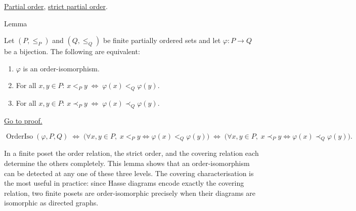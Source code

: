 \begin{dependencies}
\hyperref[def:lattice-order-partial-order]{Partial order},
\hyperref[def:lattice-order-strict-partial-order]{strict partial order}.
\end{dependencies}


\begin{lemmabox}{Lemma}
\begin{lemma}
\label{lem:order-iso-finite-characterizations}
Let $(P, \leq_P)$ and $(Q, \leq_Q)$ be finite partially ordered sets and
let $\varphi : P \to Q$ be a bijection.  The following are equivalent:
\begin{enumerate}
  \item $\varphi$ is an order-isomorphism.
  \item For all $x, y \in P$:\; $x <_P y \;\Longleftrightarrow\; \varphi(x) <_Q \varphi(y)$.
  \item For all $x, y \in P$:\; $x \prec_P y \;\Longleftrightarrow\; \varphi(x) \prec_Q \varphi(y)$.
\end{enumerate}
\hyperref[prf:order-iso-finite-characterizations]{Go to proof.}
\end{lemma}
\end{lemmabox}

\begin{remark*}
\[
\operatorname{OrderIso}(\varphi, P, Q)
\;\Longleftrightarrow\;
\bigl(\forall x,y \in P,\; x <_P y \Leftrightarrow \varphi(x) <_Q \varphi(y)\bigr)
\;\Longleftrightarrow\;
\bigl(\forall x,y \in P,\; x \prec_P y \Leftrightarrow \varphi(x) \prec_Q \varphi(y)\bigr).
\]
\end{remark*}

\begin{remark*}[Interpretation]
In a finite poset the order relation, the strict order, and the covering
relation each determine the others completely.  This lemma shows that an
order-isomorphism can be detected at any one of these three levels.  The
covering characterisation is the most useful in practice: since Hasse
diagrams encode exactly the covering relation, two finite posets are
order-isomorphic precisely when their diagrams are isomorphic as directed
graphs.
\end{remark*}

